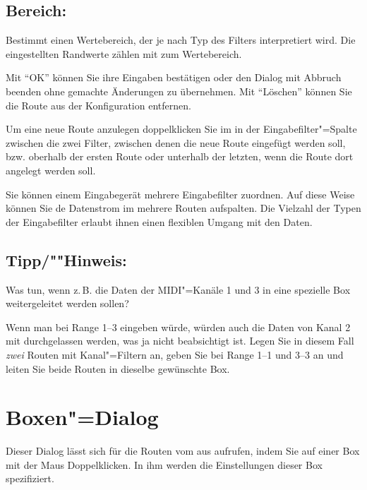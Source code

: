 \subsection{Bereich:}

Bestimmt einen Wertebereich, der je nach Typ des Filters interpretiert
wird. Die eingestellten Randwerte zählen mit zum Wertebereich.

Mit "`OK"' können Sie ihre Eingaben bestätigen oder den Dialog mit Abbruch
beenden ohne gemachte Änderungen zu übernehmen.  Mit "`Löschen"'
können Sie die Route aus der Konfiguration entfernen.


Um eine neue Route anzulegen doppelklicken Sie im
 in der Eingabefilter"=Spalte
zwischen die zwei Filter, zwischen denen die neue Route eingefügt
werden soll, bzw. oberhalb der ersten Route oder unterhalb der
letzten, wenn die Route dort angelegt werden soll.

Sie können einem Eingabegerät mehrere Eingabefilter zuordnen. 
Auf diese Weise können Sie de Datenstrom im mehrere Routen 
aufspalten. Die Vielzahl der Typen der Eingabefilter erlaubt 
ihnen einen flexiblen Umgang mit den Daten.

\subsection{Tipp/""Hinweis:}
Was tun, wenn z.\,B. die Daten der MIDI"=Kanäle 1 und 3 in eine 
spezielle Box weitergeleitet werden sollen?

Wenn man bei Range 1--3 eingeben würde, würden auch die 
Daten von Kanal 2 mit durchgelassen werden, was ja nicht beabsichtigt 
ist. Legen Sie in diesem Fall \emph{zwei} Routen mit Kanal"=Filtern 
an, geben Sie bei Range 1--1 und 3--3 an und leiten Sie beide 
Routen in dieselbe gewünschte Box. 

\section{Boxen"=Dialog}\label{sec:DE_R2}

Dieser Dialog lässt sich für die Routen vom  
aus aufrufen, indem Sie auf einer Box mit der Maus Doppelklicken. 
In ihm werden die Einstellungen dieser Box spezifiziert.

